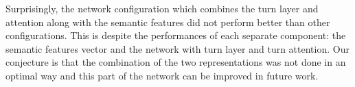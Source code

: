 Surprisingly, the network configuration which combines the turn layer and attention along with the 
semantic features did not perform better than other configurations. 
This is despite the performances of each separate component: the semantic features vector and 
the network with turn layer and turn attention. 
Our conjecture is that the combination of the two representations was not done 
in an optimal way and this part of the network can be improved in future work. 








